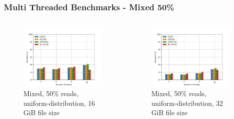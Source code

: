 \documentclass[
	aspectratio=169,
	compress,
]{beamer}
\newcommand{\navframetitle}[1]{\frametitle{#1\hfill{\footnotesize\lastsection{}}}}
\begin{document}

\begin{frame}[fragile]
	\navframetitle{Multi Threaded Benchmarks - Mixed 50\%}

	\begin{columns}
		\begin{column}{0.5\textwidth}
			\begin{figure}[ht]
    			\centering
    			\includegraphics[width=\textwidth]{multi_16_gb_rw_50to50_uniform.jpg}
        		\caption{Mixed, 50\% reads, uniform-distribution, 16 GiB file size}
			\end{figure}
		\end{column}
		\begin{column}{0.5\textwidth}
			\begin{figure}[ht]
    			\centering
    			\includegraphics[width=\textwidth]{multi_32_gb_rw_50to50_uniform.jpg}
        		\caption{Mixed, 50\% reads, uniform-distribution, 32 GiB file size}
			\end{figure}			
		\end{column}
	\end{columns}
\end{frame}
\end{document}
